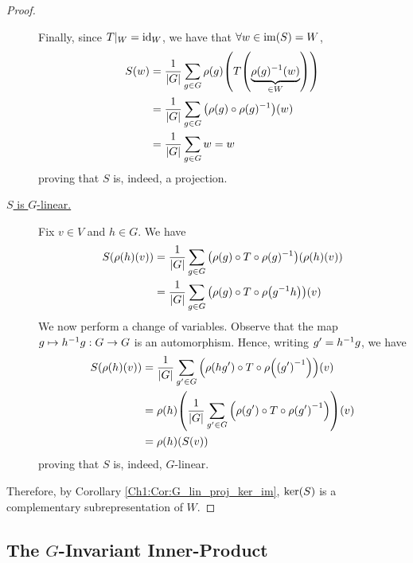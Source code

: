 \begin{proof}
\begin{description}
        Finally, since $T\vert_W = \operatorname{id}_W$, we have that $\forall w \in \operatorname{im}\!\left( S \right) = W$,
        \begin{align*}
            S(w) &= \frac{1}{\left\lvert G \right\rvert} \sum_{g \in G} \rho(g)\!\left( T\!\left( \underbrace{\rho(g)^{-1}(w)}_{\in W} \right) \right) \\
            &= \frac{1}{\left\lvert G \right\rvert} \sum_{g \in G} \left( \rho(g) \circ \rho(g)^{-1} \right)\!(w) \\
            &= \frac{1}{\left\lvert G \right\rvert} \sum_{g \in G} w = w
        \end{align*}
        proving that $S$ is, indeed, a projection.

        \item[\underline{$S$ is $G$-linear.}]
        Fix $v \in V$ and $h \in G$. We have
        \begin{align*}
            S\!\left( \rho(h)(v) \right) &= \frac{1}{\left\lvert G \right\rvert} \sum_{g \in G} \left( \rho(g) \circ T \circ \rho(g)^{-1} \right)\!\left( \rho(h)(v) \right) \\
            &=  \frac{1}{\left\lvert G \right\rvert} \sum_{g \in G} \left( \rho(g) \circ T \circ \rho\!\left( g^{-1} h \right) \right)\!(v)
        \end{align*}
        We now perform a change of variables. Observe that the map $g \mapsto h^{-1} g : G \to G$ is an automorphism. Hence, writing $g' = h^{-1} g$, we have
        \begin{align*}
            \Sof{\rho(h)(v)} &=  \frac{1}{\abs{G}} \sum_{g' \in G} \parenth{\rhoof{hg'} \circ T \circ \rhoof{\parenth{g'}\inv}}\!(v) \\
            &= \rhoof{h}\!\parenth{ \frac{1}{\abs{G}} \sum_{g' \in G} \parenth{\rhoof{g'} \circ T \circ \rhoof{g'}\inv}}\!(v) \\
            &= \rho(h)\!\parenth{\Sof{v}}
        \end{align*}
        proving that $S$ is, indeed, $G$-linear.
    \end{description}
    Therefore, by Corollary \ref{Ch1:Cor:G_lin_proj_ker_im}, $\operatorname{ker}\!\left( S \right)$ is a complementary subrepresentation of $W$.
\end{proof}



\subsection{The $G$-Invariant Inner-Product}

